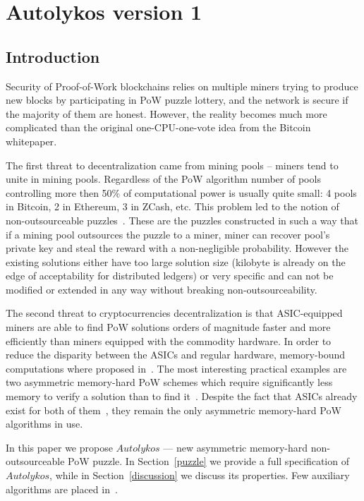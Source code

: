 \documentclass[]{article}
\newcommand{\Name}{$Autolykos$}
\begin{document}
    \section{Autolykos version 1}
    \label{av1}

    \subsection{Introduction}

    Security of Proof-of-Work blockchains relies
    on multiple miners trying to produce new blocks by
    participating in PoW puzzle lottery, and the network is secure if the
    majority of them are honest. However, the reality becomes much more complicated
    than the original one-CPU-one-vote idea from the Bitcoin whitepaper\cite{nakamoto2008bitcoin}.

    The first threat to decentralization came from mining pools -- miners tend
    to unite in mining pools.
    Regardless of the PoW algorithm number of pools controlling more then 50\% of
    computational power is usually quite small: 4 pools in Bitcoin, 2 in Ethereum, 3 in ZCash, etc.
    This problem led to the notion of non-outsourceable puzzles~\cite{miller2015nonoutsourceable,daian2017piecework}.
    These are the puzzles constructed in such a way that if a mining pool outsources the puzzle
    to a miner, miner can recover pool's private key and steal the reward with a non-negligible probability.
    However the existing solutions either have too large solution size (kilobyte is already
    on the edge of acceptability for distributed ledgers) or very specific and
    can not be modified or extended in any way without breaking non-outsourceability.

    The second threat to cryptocurrencies decentralization is that ASIC-equipped miners are
    able to find PoW solutions orders of magnitude faster and more efficiently
    than miners equipped with the commodity hardware. In order to reduce the
    disparity between the ASICs and regular hardware, memory-bound computations
    where proposed in~\cite{dwork2003memory}. The most interesting practical
    examples are two
    asymmetric memory-hard PoW schemes which require significantly less memory
    to verify a solution than to find it~\cite{biryukov2017equihash,ethHash}.
    Despite the fact that ASICs already exist for both of them~\cite{ETHAsics,EquihashAsics},
    they remain the only asymmetric memory-hard PoW algorithms in use.

    In this paper we propose \Name{} --- new asymmetric memory-hard non-outsourceable PoW puzzle.
    In Section~\ref{puzzle} we provide a full
    specification of \Name, while in Section~\ref{discussion} we discuss its
    properties. Few auxiliary algorithms are placed in~.
\end{document}
